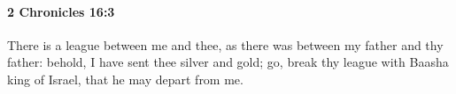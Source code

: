 
		\paragraph{2 Chronicles 16:3} %
			\label{2CHRONICLES-16-3}

			There is a league between me and thee, as there was between my father and thy father: behold, I have sent thee silver and gold; go, break thy league with Baasha king of Israel, that he may depart from me.


